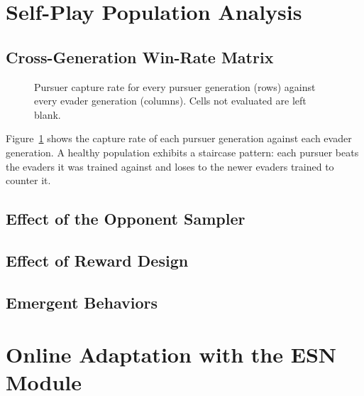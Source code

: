 \section{Self-Play Population Analysis}
\label{sec:selfplay-results}

\subsection{Cross-Generation Win-Rate Matrix}
\noindent
\begin{figure}[t]
    \begin{center}
    \end{center}
    \caption[Cross-generation win-rate matrix]{Pursuer capture rate for every pursuer generation (rows) against every evader generation (columns). Cells not evaluated are left blank.}
    \label{fig:winrate}
\end{figure}

Figure~\ref{fig:winrate} shows the capture rate of each pursuer generation against each evader generation. A healthy population exhibits a staircase pattern: each pursuer beats the evaders it was trained against and loses to the newer evaders trained to counter it.

\subsection{Effect of the Opponent Sampler}
\noindent

\subsection{Effect of Reward Design}
\noindent

\subsection{Emergent Behaviors}
\noindent

\section{Online Adaptation with the ESN Module}
\label{sec:esn-results}

